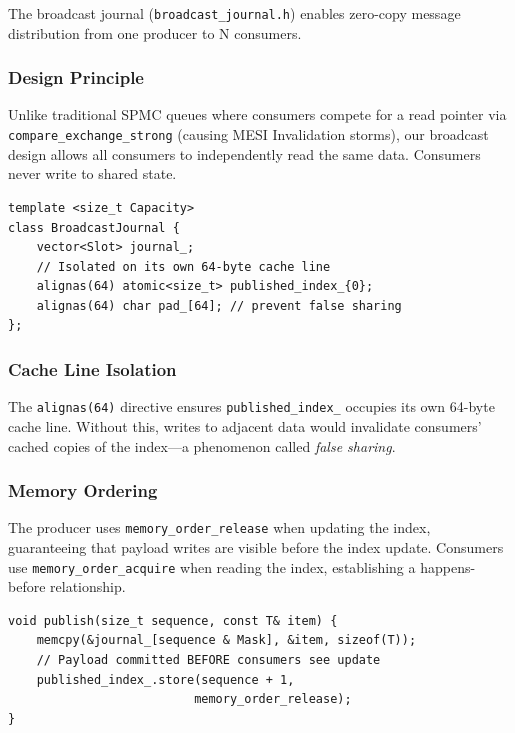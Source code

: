 \documentclass[conference]{IEEEtran}
\begin{document}
The broadcast journal (\texttt{broadcast\_journal.h}) enables zero-copy message distribution from one producer to N consumers.

\subsubsection{Design Principle}

Unlike traditional SPMC queues where consumers compete for a read pointer via \texttt{compare\_exchange\_strong} (causing MESI Invalidation storms), our broadcast design allows all consumers to independently read the same data. Consumers never write to shared state.

\begin{lstlisting}[style=cppstyle, caption={Broadcast journal core design}]
template <size_t Capacity>
class BroadcastJournal {
    vector<Slot> journal_;
    // Isolated on its own 64-byte cache line
    alignas(64) atomic<size_t> published_index_{0};
    alignas(64) char pad_[64]; // prevent false sharing
};
\end{lstlisting}

\subsubsection{Cache Line Isolation}

The \texttt{alignas(64)} directive ensures \texttt{published\_index\_} occupies its own 64-byte cache line. Without this, writes to adjacent data would invalidate consumers' cached copies of the index---a phenomenon called \textit{false sharing}.

\subsubsection{Memory Ordering}

The producer uses \texttt{memory\_order\_release} when updating the index, guaranteeing that payload writes are visible before the index update. Consumers use \texttt{memory\_order\_acquire} when reading the index, establishing a happens-before relationship.

\begin{lstlisting}[style=cppstyle, caption={Producer publish with release fence}]
void publish(size_t sequence, const T& item) {
    memcpy(&journal_[sequence & Mask], &item, sizeof(T));
    // Payload committed BEFORE consumers see update
    published_index_.store(sequence + 1,
                          memory_order_release);
}
\end{lstlisting}
\end{document}
